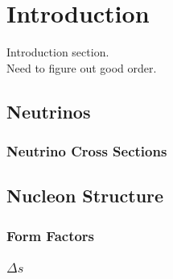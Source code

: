 \section{Introduction} \label{intro}
\hspace{\parindent}
Introduction section. \\
Need to figure out good order.

\subsection{Neutrinos}
\subsubsection{Neutrino Cross Sections}
\subsection{Nucleon Structure}
\subsubsection{Form Factors}
\subsubsection{$\Delta s$}


